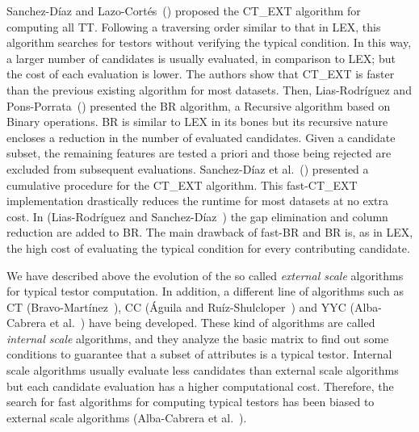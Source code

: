 \documentclass[citeauthoryear]{llncs}
\begin{document}
	Sanchez-D\'iaz and Lazo-Cort\'es~(\cite{Sanchez2007}) proposed the CT\_EXT algorithm for computing all TT. Following a traversing order similar to that in LEX, this algorithm searches for testors without verifying the typical condition. In this way, a larger number of candidates is usually evaluated, in comparison to LEX; but the cost of each evaluation is lower. The authors show that CT\_EXT is faster than the previous existing algorithm for most datasets. Then, Lias-Rodr\'iguez and Pons-Porrata~(\cite{Lias2009}) presented the BR algorithm, a Recursive algorithm based on Binary operations. BR is similar to LEX in its bones but its recursive nature encloses a reduction in the number of evaluated candidates. Given a candidate subset, the remaining features are tested a priori and those being rejected are excluded from subsequent evaluations. Sanchez-D\'iaz et al.~(\cite{Sanchez2010}) presented a cumulative procedure for the CT\_EXT algorithm. This fast-CT\_EXT implementation drastically reduces the runtime for most datasets at no extra cost. In (Lias-Rodr\'iguez and Sanchez-D\'iaz~\cite{Lias2013}) the gap elimination and column reduction are added to BR. The main drawback of fast-BR and BR is, as in LEX, the high cost of evaluating the typical condition for every contributing candidate. 
	
	We have described above the evolution of the so called \emph{external scale} algorithms for typical testor computation. In addition, a different line of algorithms such as CT (Bravo-Martínez~\cite{Bravo83}), CC (Águila and Ruíz-Shulcloper~\cite{Aguila84}) and YYC (Alba-Cabrera et al.~\cite{Alba14}) have being developed. These kind of algorithms are called \emph{internal scale} algorithms, and they analyze the basic matrix to find out some conditions to guarantee that a subset of attributes is a typical testor. Internal scale algorithms usually evaluate less candidates than external scale algorithms but each candidate evaluation has a higher computational cost. Therefore, the search for fast algorithms for computing typical testors has been biased to external scale algorithms (Alba-Cabrera et al.~\cite{Alba14}).
	
\end{document}

